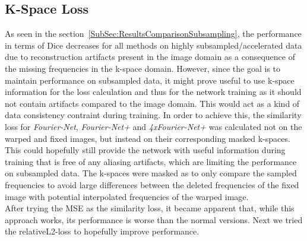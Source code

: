 \documentclass[english,version-2022-01]{uzl-thesis} %
\begin{document}
\subsection{K-Space Loss}
As seen in the section~\ref{SubSec:ResultsComparisonSubsampling}, the performance in terms of Dice decreases for all methods on highly subsampled/accelerated data due to reconstruction artifacts present in the image domain as a consequence of the missing frequencies in the k-space domain. However, since the goal is to maintain performance on subsampled data, it might prove useful to use k-space information for the loss calculation and thus for the network training as it should not contain artifacts compared to the image domain. This would act as a kind of data consistency contraint during training. In order to achieve this, the similarity loss for \emph{Fourier-Net}, \emph{Fourier-Net+} and \emph{4xFourier-Net+} was calculated not on the warped and fixed images, but instead on their corresponding masked k-spaces. This could hopefully still provide the network with useful information during training that is free of any aliasing artifacts, which are limiting the performance on subsampled data. The k-spaces were masked as to only compare the sampled frequencies to avoid large differences between the deleted frequencies of the fixed image with potential interpolated frequencies of the warped image. \\
After trying the MSE as the similarity loss, it became apparent that, while this approach works, its performance is worse than the normal versions. Next we tried the relativeL2-loss to hopefully improve performance.

\end{document}
